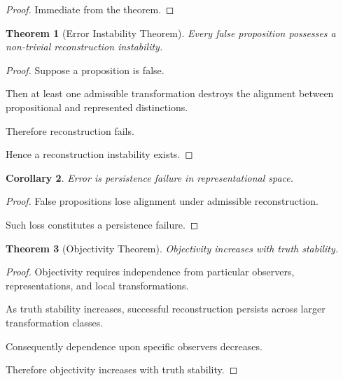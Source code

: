 \documentclass[12pt,oneside]{article}
\newtheorem{theorem}{Theorem}[section] \newtheorem{lemma}[theorem]{Lemma} \newtheorem{proposition}[theorem]{Proposition} \newtheorem{corollary}[theorem]{Corollary}
\theoremstyle{definition}
\begin{document}
\begin{proof}

Immediate from the theorem.

\end{proof}

\begin{theorem}[Error Instability Theorem]

Every false proposition possesses a non-trivial reconstruction instability.

\end{theorem}

\begin{proof}

Suppose a proposition is false.

Then at least one admissible transformation destroys the alignment between propositional and represented distinctions.

Therefore reconstruction fails.

Hence a reconstruction instability exists.

\end{proof}

\begin{corollary}

Error is persistence failure in representational space.

\end{corollary}

\begin{proof}

False propositions lose alignment under admissible reconstruction.

Such loss constitutes a persistence failure.

\end{proof}

\begin{theorem}[Objectivity Theorem]

Objectivity increases with truth stability.

\end{theorem}

\begin{proof}

Objectivity requires independence from particular observers, representations, and local transformations.

As truth stability increases, successful reconstruction persists across larger transformation classes.

Consequently dependence upon specific observers decreases.

Therefore objectivity increases with truth stability.

\end{proof}
\end{document}
